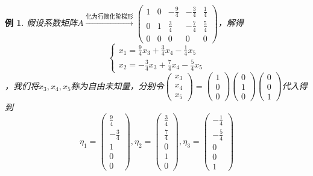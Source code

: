 \documentclass[12pt, a4paper, oneside]{ctexbook}
\newtheorem{example}[theorem]{例}
\begin{document}
\begin{example}
    假设系数矩阵$A \xrightarrow{\mbox{化为行简化阶梯形}} \begin{pmatrix}
        1 & 0 & -\frac{9}{4} & -\frac{3}{4} & \frac{1}{4} \\
        0 & 1 & \frac{3}{4} & -\frac{7}{4} & \frac{5}{4} \\
        0 & 0 & 0 & 0 & 0
    \end{pmatrix}$，解得$$\begin{cases}
        x_1=\frac{9}{4}x_3 + \frac{3}{4}x_4 - \frac{1}{4}x_5 \\
        x_2=-\frac{3}{4}x_3 + \frac{7}{4}x_4 - \frac{5}{4}x_5
    \end{cases}$$，我们将$x_3,x_4,x_5$称为自由未知量，分别令$\begin{pmatrix}
        x_3 \\ x_4 \\ x_5
    \end{pmatrix} = \begin{pmatrix}
        1 \\ 0 \\ 0
    \end{pmatrix} \begin{pmatrix}
        0 \\ 1 \\ 0
    \end{pmatrix} \begin{pmatrix}
        0 \\ 0 \\ 1
    \end{pmatrix}$代入得到$$\eta_1 = \begin{pmatrix}
        \frac{9}{4} \\ -\frac{3}{4} \\ 1 \\ 0 \\ 0
    \end{pmatrix}, \eta_2 = \begin{pmatrix}
        \frac{3}{4} \\ \frac{7}{4} \\ 0 \\ 1 \\ 0
    \end{pmatrix}, \eta_3 = \begin{pmatrix}
        -\frac{1}{4} \\ -\frac{5}{4} \\ 0 \\ 0 \\ 1
    \end{pmatrix}$$
\end{example}
\end{document}
